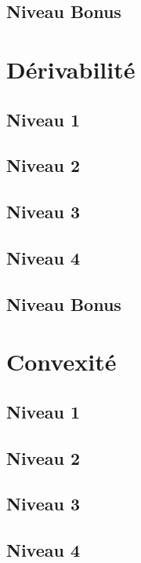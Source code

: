 \documentclass[a4paper]{report}
\begin{document}
			\subsection{Niveau Bonus}
		
		\section{Dérivabilité}
		
			\subsection{Niveau 1}
		
			\subsection{Niveau 2}
		
			\subsection{Niveau 3}
			
			\subsection{Niveau 4}
			
			\subsection{Niveau Bonus}
		
		\section{Convexité}
		
			\subsection{Niveau 1}
		
			\subsection{Niveau 2}
		
			\subsection{Niveau 3}
			
			\subsection{Niveau 4}
			
\end{document}
